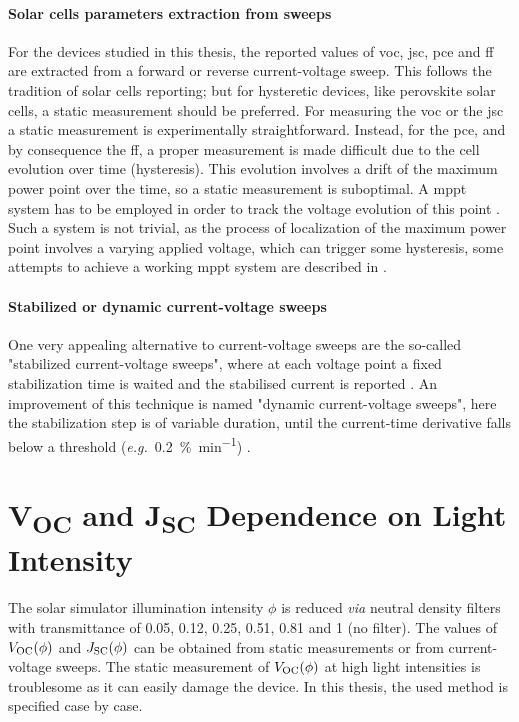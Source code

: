 	\paragraph{Solar cells parameters extraction from sweeps}\label{characterization_hysteresis}
	For the devices studied in this thesis, the reported values of \gls{voc}, \gls{jsc}, \gls{pce} and \gls{ff} are extracted from a forward or reverse current-voltage sweep.
	This follows the tradition of solar cells reporting; but for hysteretic devices, like perovskite solar cells, a static measurement should be preferred.
	For measuring the \gls{voc} or the \gls{jsc} a static measurement is experimentally straightforward.
	Instead, for the \gls{pce}, and by consequence the \gls{ff}, a proper measurement is made difficult due to the cell evolution over time (hysteresis).
	This evolution involves a drift of the maximum power point over the time, so a static measurement is suboptimal.
	A \gls{mppt} system has to be employed in order to track the voltage evolution of this point \cite{Zimmermann2016}.
	Such a system is not trivial, as the process of localization of the maximum power point involves a varying applied voltage, which can trigger some hysteresis, some attempts to achieve a working \gls{mppt} system are described in .

	\paragraph{Stabilized or dynamic current-voltage sweeps}
	One very appealing alternative to current-voltage sweeps are the so-called "stabilized current-voltage sweeps", where at each voltage point a fixed stabilization time is waited and the stabilised current is reported \cite{Unger2014, Christoforo2015, Christians2015}.
	An improvement of this technique is named "dynamic current-voltage sweeps", here the stabilization step is of variable duration, until the current\hyp{}time derivative falls below a threshold (\textsl{e.g.}\ \SI{0.2}{\%\per\minute}) \cite{Dunbar2017,Dunbar2017a}.


\section{V\textsubscript{OC} and J\textsubscript{SC} Dependence on Light Intensity}
	The solar simulator illumination intensity $\phi$ is reduced \textsl{via} neutral density filters with transmittance of 0.05, 0.12, 0.25, 0.51, 0.81 and 1 (no filter).
	The values of $V_\mathrm{OC}(\phi)$ and $J_\mathrm{SC}(\phi)$ can be obtained from static measurements or from current-voltage sweeps.
	The static measurement of $V_\mathrm{OC}(\phi)$ at high light intensities is troublesome as it can easily damage the device.
	In this thesis, the used method is specified case by case.


